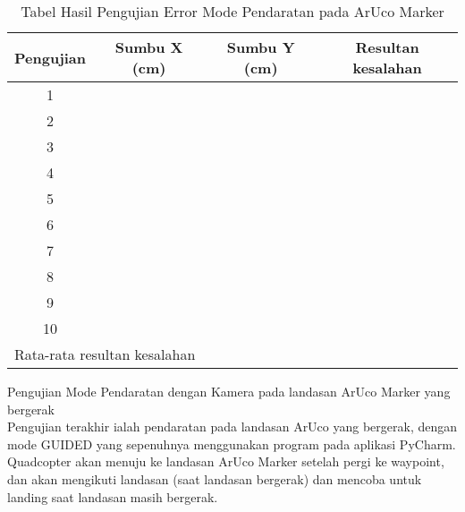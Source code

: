 \begin{packed_enum}
	\begin{table}[h]
		\label{tab:arucobasedland}
		\centering
		\begin{tabular}{|ccc|c|}
			\hline
			\multicolumn{1}{|c|}{Pengujian} & \multicolumn{1}{c|}{Sumbu X (cm)} & Sumbu Y (cm) & Resultan kesalahan    \\ \hline
			\multicolumn{1}{|c|}{1}         & \multicolumn{1}{c|}{}             &              &                       \\ \hline
			\multicolumn{1}{|c|}{2}         & \multicolumn{1}{c|}{}             &              &                       \\ \hline
			\multicolumn{1}{|c|}{3}         & \multicolumn{1}{c|}{}             &              &                       \\ \hline
			\multicolumn{1}{|c|}{4}         & \multicolumn{1}{c|}{}             &              &                       \\ \hline
			\multicolumn{1}{|c|}{5}         & \multicolumn{1}{c|}{}             &              &                       \\ \hline
			\multicolumn{1}{|c|}{6}         & \multicolumn{1}{c|}{}             &              &                       \\ \hline
			\multicolumn{1}{|c|}{7}         & \multicolumn{1}{c|}{}             &              &                       \\ \hline
			\multicolumn{1}{|c|}{8}         & \multicolumn{1}{c|}{}             &              &                       \\ \hline
			\multicolumn{1}{|c|}{9}         & \multicolumn{1}{c|}{}             &              &                       \\ \hline
			\multicolumn{1}{|c|}{10}        & \multicolumn{1}{c|}{}             &              &                       \\ \hline
			\multicolumn{3}{|l|}{Rata-rata resultan kesalahan}                                 & \multicolumn{1}{l|}{} \\ \hline
		\end{tabular}
		\caption{Tabel Hasil Pengujian Error Mode Pendaratan pada ArUco Marker}
	\end{table}
	
	\item Pengujian Mode Pendaratan dengan Kamera pada landasan ArUco Marker yang bergerak
	\\Pengujian terakhir ialah pendaratan pada landasan ArUco yang bergerak, dengan mode GUIDED yang sepenuhnya menggunakan program pada aplikasi PyCharm. Quadcopter akan menuju ke landasan ArUco Marker setelah pergi ke waypoint, dan akan mengikuti landasan (saat landasan bergerak) dan mencoba untuk landing saat landasan masih bergerak.
	

\end{packed_enum}
